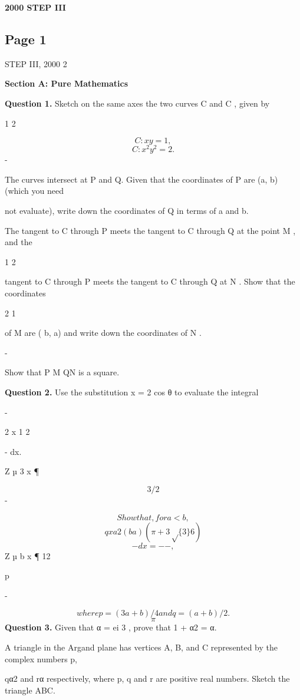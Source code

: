\documentclass[12pt]{article}
\begin{document}
\begin{center}
{\Large \textbf{2000 STEP III}}
\end{center}

\subsection*{Page 1}
\begin{flushleft}
STEP III, 2000 2\par
\bigskip\textbf{Section A: Pure Mathematics}\par
\bigskip\textbf{Question 1.} Sketch on the same axes the two curves C and C , given by\par
1 2\par
\[C : xy = 1 ,\]
\[C : x^2 y^2 = 2 .\]
-\par
The curves intersect at P and Q. Given that the coordinates of P are (a, b) (which you need\par
not evaluate), write down the coordinates of Q in terms of a and b.\par
The tangent to C through P meets the tangent to C through Q at the point M , and the\par
1 2\par
tangent to C through P meets the tangent to C through Q at N . Show that the coordinates\par
2 1\par
of M are ( b, a) and write down the coordinates of N .\par
-\par
Show that P M QN is a square.\par
\bigskip\textbf{Question 2.} Use the substitution x = 2 cos θ to evaluate the integral\par
-\par
2 x 1 2\par
- dx.\par
Z µ 3 x ¶\par
\[3/2\]
-\par
\[Show that, for a < b,\]
\[q x a 2 (b a)(\pi + 3\sqrt\{3\} 6)\]
\[- dx = - - ,\]
Z µ b x ¶ 12\par
p\par
-\par
\[where p = (3a + b)/4 and q = (a + b)/2.\]
\[\pi\]
\bigskip\textbf{Question 3.} Given that α = ei 3 , prove that 1 + α2 = α.\par
A triangle in the Argand plane has vertices A, B, and C represented by the complex numbers p,\par
qα2 and rα respectively, where p, q and r are positive real numbers. Sketch the triangle ABC.\par

\end{flushleft}
\end{document}
